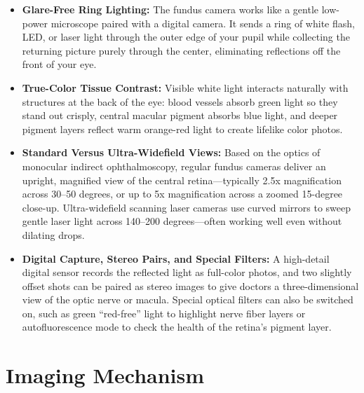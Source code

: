 \begin{itemize}
    \item \textbf{Glare-Free Ring Lighting:} The fundus camera works like a gentle low-power microscope paired with a digital camera. It sends a ring of white flash, LED, or laser light through the outer edge of your pupil while collecting the returning picture purely through the center, eliminating reflections off the front of your eye.
    \item \textbf{True-Color Tissue Contrast:} Visible white light interacts naturally with structures at the back of the eye: blood vessels absorb green light so they stand out crisply, central macular pigment absorbs blue light, and deeper pigment layers reflect warm orange-red light to create lifelike color photos.
    \item \textbf{Standard Versus Ultra-Widefield Views:} Based on the optics of monocular indirect ophthalmoscopy, regular fundus cameras deliver an upright, magnified view of the central retina---typically 2.5x magnification across 30--50 degrees, or up to 5x magnification across a zoomed 15-degree close-up. Ultra-widefield scanning laser cameras use curved mirrors to sweep gentle laser light across 140--200 degrees---often working well even without dilating drops.
    \item \textbf{Digital Capture, Stereo Pairs, and Special Filters:} A high-detail digital sensor records the reflected light as full-color photos, and two slightly offset shots can be paired as stereo images to give doctors a three-dimensional view of the optic nerve or macula. Special optical filters can also be switched on, such as green ``red-free'' light to highlight nerve fiber layers or autofluorescence mode to check the health of the retina's pigment layer.
\end{itemize}

\section{Imaging Mechanism}

